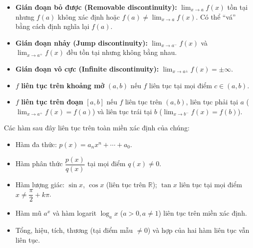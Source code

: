\documentclass[12pt,a4paper]{article}
\begin{document}
\begin{dinhnghia}[title={Các loại gián đoạn}]
  \begin{itemize}
    \item \textbf{Gián đoạn bỏ được (Removable discontinuity):} $\displaystyle\lim_{x \to a} f(x)$ tồn tại nhưng $f(a)$ không xác định hoặc $f(a) \ne \lim_{x \to a} f(x)$. Có thể ``vá'' bằng cách định nghĩa lại $f(a)$.
    \item \textbf{Gián đoạn nhảy (Jump discontinuity):} $\displaystyle\lim_{x \to a^-} f(x)$ và $\displaystyle\lim_{x \to a^+} f(x)$ đều tồn tại nhưng không bằng nhau.
    \item \textbf{Gián đoạn vô cực (Infinite discontinuity):} $\displaystyle\lim_{x \to a^{\pm}} f(x) = \pm\infty$.
  \end{itemize}
\end{dinhnghia}

\begin{dinhnghia}[title={Liên tục trên khoảng}]
  \begin{itemize}
    \item $f$ \textbf{liên tục trên khoảng mở} $(a, b)$ nếu $f$ liên tục tại mọi điểm $c \in (a, b)$.
    \item $f$ \textbf{liên tục trên đoạn} $[a, b]$ nếu $f$ liên tục trên $(a, b)$, liên tục phải tại $a$ ($\lim_{x \to a^+} f(x) = f(a)$) và liên tục trái tại $b$ ($\lim_{x \to b^-} f(x) = f(b)$).
  \end{itemize}
\end{dinhnghia}

\begin{tinhchat}[title={Các hàm liên tục cơ bản}]
  Các hàm sau đây liên tục trên toàn miền xác định của chúng:
  \begin{itemize}
    \item Hàm đa thức: $p(x) = a_n x^n + \cdots + a_0$.
    \item Hàm phân thức $\dfrac{p(x)}{q(x)}$ tại mọi điểm $q(x) \ne 0$.
    \item Hàm lượng giác: $\sin x$, $\cos x$ (liên tục trên $\mathbb{R}$); $\tan x$ liên tục tại mọi điểm $x \ne \dfrac{\pi}{2} + k\pi$.
    \item Hàm mũ $a^x$ và hàm logarit $\log_a x$ ($a > 0, a \ne 1$) liên tục trên miền xác định.
    \item Tổng, hiệu, tích, thương (tại điểm mẫu $\ne 0$) và hợp của hai hàm liên tục vẫn liên tục.
  \end{itemize}
\end{tinhchat}
\end{document}
